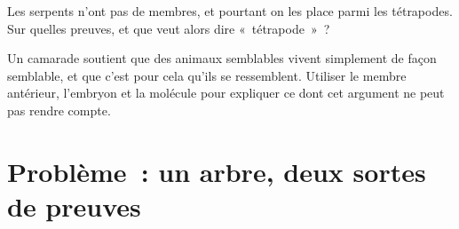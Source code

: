 \begin{exercise}[$\star\star\star$]\label{exo:g10:common-ancestry:14}
Les serpents n'ont pas de membres, et pourtant on les place parmi les
tétrapodes. Sur quelles preuves, et que veut alors dire
«~tétrapode~»~?
\end{exercise}

\begin{exercise}[$\star\star\star$]\label{exo:g10:common-ancestry:15}
Un camarade soutient que des animaux semblables vivent simplement de
façon semblable, et que c'est pour cela qu'ils se ressemblent. Utiliser
le membre antérieur, l'embryon et la molécule pour expliquer ce dont
cet argument ne peut pas rendre compte.
\end{exercise}

\section{Problème~: un arbre, deux sortes de preuves}

